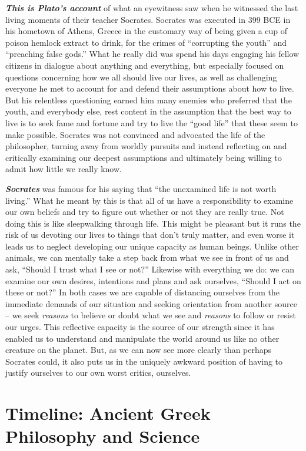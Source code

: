\documentclass[
  12pt, openany]{book}
\begin{document}
\textbf{\emph{This is Plato's account}} of what an eyewitness saw when he witnessed the last living moments of their teacher Socrates. Socrates was executed in 399 BCE in his hometown of Athens, Greece in the customary way of being given a cup of poison hemlock extract to drink, for the crimes of ``corrupting the youth'' and ``preaching false gods.'' What he really did was spend his days engaging his fellow citizens in dialogue about anything and everything, but especially focused on questions concerning how we all should live our lives, as well as challenging everyone he met to account for and defend their assumptions about how to live. But his relentless questioning earned him many enemies who preferred that the youth, and everybody else, rest content in the assumption that the best way to live is to seek fame and fortune and try to live the ``good life'' that these seem to make possible. Socrates was not convinced and advocated the life of the philosopher, turning away from worldly pursuits and instead reflecting on and critically examining our deepest assumptions and ultimately being willing to admit how little we really know.

\textbf{\emph{Socrates}} was famous for his saying that ``the unexamined life is not worth living.'' What he meant by this is that all of us have a responsibility to examine our own beliefs and try to figure out whether or not they are really true. Not doing this is like sleepwalking through life. This might be pleasant but it runs the risk of us devoting our lives to things that don't truly matter, and even worse it leads us to neglect developing our unique capacity as human beings. Unlike other animals, we can mentally take a step back from what we see in front of us and ask, ``Should I trust what I see or not?'' Likewise with everything we do: we can examine our own desires, intentions and plans and ask ourselves, ``Should I act on these or not?'' In both cases we are capable of distancing ourselves from the immediate demands of our situation and seeking orientation from another source -- we seek \emph{reasons} to believe or doubt what we see and \emph{reasons} to follow or resist our urges. This reflective capacity is the source of our strength since it has enabled us to understand and manipulate the world around us like no other creature on the planet. But, as we can now see more clearly than perhaps Socrates could, it also puts us in the uniquely awkward position of having to justify ourselves to our own worst critics, ourselves.

\hypertarget{timeline-ancient-greek-philosophy-and-science}{%
\section{Timeline: Ancient Greek Philosophy and Science}\label{timeline-ancient-greek-philosophy-and-science}}
\end{document}
